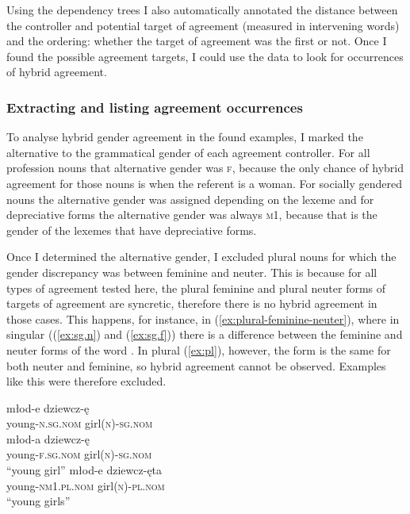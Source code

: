 Using the dependency trees I also automatically annotated the distance between the controller and potential target of agreement (measured in intervening words) and the ordering: whether the target of agreement was the first or not. Once I found the possible agreement targets, I could use the data to look for occurrences of hybrid agreement.

\subsubsection{Extracting and listing agreement occurrences}
To analyse hybrid gender agreement in the found examples, I marked the alternative to the grammatical gender of each agreement controller. For all profession nouns that alternative gender was \textsc{f}, because the only chance of hybrid agreement for those nouns is when the referent is a woman. For socially gendered nouns the alternative gender was assigned depending on the lexeme and for depreciative forms the alternative gender was always \textsc{m1}, because that is the gender of the lexemes that have depreciative forms.

Once I determined the alternative gender, I excluded plural nouns for which the gender discrepancy was between feminine and neuter. This is because for all types of agreement tested here, the plural feminine and plural neuter forms of targets of agreement are syncretic, therefore there is no hybrid agreement in those cases. This happens, for instance, in (\ref{ex:plural-feminine-neuter}), where in singular ((\ref{ex:sg.n}) and (\ref{ex:sg.f})) there is a difference between the feminine and neuter forms of the word . In plural (\ref{ex:pl}), however, the form is the same for both neuter and feminine, so hybrid agreement cannot be observed. Examples like this were therefore excluded.

\begin{exe}
  \ex\label{ex:plural-feminine-neuter}
  \begin{xlist}
    \ex\label{ex:sg.n}
    \gll młod-e dziewcz-ę\\
    young\textsc{-n.sg.nom} girl\textsc{(n)-sg.nom}\\
    \ex\label{ex:sg.f}
    \gll młod-a dziewcz-ę\\
    young\textsc{-f.sg.nom} girl\textsc{(n)-sg.nom}\\
    \glt ``young girl''
    \ex\label{ex:pl}
    \gll młod-e dziewcz-ęta\\
    young\textsc{-nm1.pl.nom} girl\textsc{(n)-pl.nom}\\
    \glt ``young girls''
  \end{xlist}
\end{exe}

